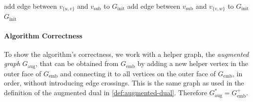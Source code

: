 \begin{algorithm}[H]
{    add edge between $v_{\{u,v\}}$ and $v_\text{sub}$ to $G_\text{init}$\;
    add edge between $v_\text{sub}$ and $v_{\{v,w\}}$ to $G_\text{init}$\;
    \label{line:transformation-loop3-end}
  }
  \Return $G_\text{init}$
\end{algorithm}
\vfill



\paragraph{Algorithm Correctness}

To show the algorithm's correctness, we work with a helper graph, the \emph{augmented graph} $G_\text{aug}$, that can be obtained from $G_\text{emb}$ by adding a new helper vertex in the outer face of $G_\text{emb}$ and connecting it to all vertices on the outer face of $G_\text{emb}$, in order, without introducing edge crossings.
This is the same graph as used in the definition of the augmented dual in \cref{def:augmented-dual}.
Therefore $G_\text{aug}^* = G_\text{emb}^+$.

